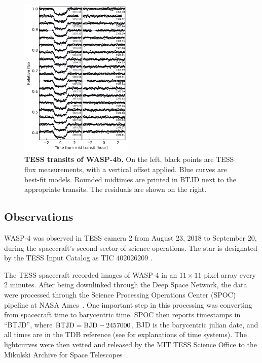 \documentclass[12pt,twocolumn,tighten]{aastex62}
\begin{document}
\begin{figure}[t]
    \begin{center}
        \includegraphics[width=0.48\textwidth]{f1.png}
    \end{center}
    \vspace{-0.5cm}
    \caption{
        {\bf TESS transits of WASP-4b.} On the left, black points are
        TESS flux measurements, with a vertical offset applied. Blue
        curves are best-fit models. Rounded midtimes are printed in
        BTJD next to the appropriate transits.  The residuals are
        shown on the right.
        \label{fig:lightcurves}
    }
\end{figure}

\subsection{Observations}
WASP-4 was observed in TESS camera 2 from August 23, 2018 to September
20, during the spacecraft's second sector of science operations.  The
star is designated by the TESS Input Catalog as TIC 402026209
\citep{stassun_TIC_2018}.

The TESS spacecraft recorded images of WASP-4 in an $11\times11$ pixel
array every 2 minutes.   After being downlinked through
the Deep Space Network, the data were processed through the Science
Processing Operations Center (SPOC) pipeline at NASA
Ames~\citep{jenkins_tess_2016}.  One important step in this processing
was converting from spacecraft time to barycentric time.  SPOC then
reports timestamps in ``BTJD'', where ${\rm BTJD} = {\rm BJD} -
2457000$, BJD is the barycentric julian date, and all times are in the
TDB reference (see \citealt{urban_explanatory_2012} for explanations of
time systems).  The lightcurves were then vetted and released by the MIT
TESS Science Office to the Mikulski Archive for Space
Telescopes~\citep{ricker_tess_alerts_2018}.
\end{document}
